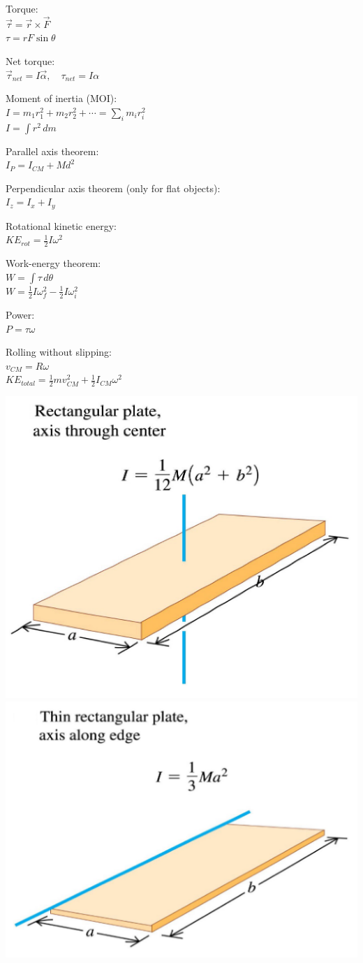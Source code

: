 \documentclass[10pt,landscape,a4paper]{article}
\begin{document}
\begin{multicols*}{5}
  Torque: \\
  \(\vec{\tau} = \vec{r} \times \vec{F}\) \\
  \(\tau = rF \sin \theta\)

  Net torque: \\
  \(\vec{\tau}_{net} = I \vec{\alpha}, \quad \tau_{net} = I \alpha\)

  Moment of inertia (MOI): \\
  \(I = m_1r_1^2 + m_2r_2^2 + \cdots = \sum_i m_i r_i^2\) \\
  \(I = \int r^2 \, dm\)

  Parallel axis theorem: \\
  \(I_P = I_{CM} + Md^2\)

  Perpendicular axis theorem (only for flat objects): \\
  \(I_z = I_x + I_y\)

  Rotational kinetic energy: \\
  \(KE_{rot} = \frac{1}{2} I \omega^2\)

  Work-energy theorem: \\
  \(W = \int \tau \, d \theta\) \\
  \(W = \frac{1}{2} I \omega_f^2 - \frac{1}{2} I \omega_i^2\)

  Power: \\
  \(P = \tau \omega\)

  Rolling without slipping: \\
  \(v_{CM} = R \omega\) \\
  \(KE_{total} = \frac{1}{2}mv_{CM}^2 + \frac{1}{2}I_{CM} \omega^2\)

  \includegraphics[width = 0.74\linewidth]{rectangular-plate-moi-1}
  \includegraphics[width = 0.74\linewidth]{rectangular-plate-moi-2}


\end{multicols*}
\end{document}
